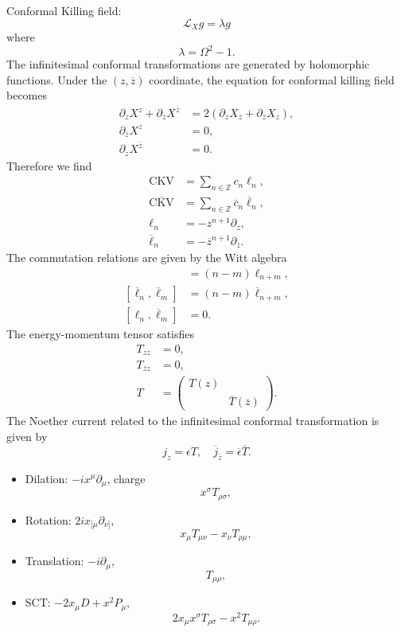 \documentclass{article}
\begin{document}
Conformal Killing field:
\[ \mathcal{L}_X g = \lambda g \]
where
\[ \lambda = \Omega^2 - 1. \]
The infinitesimal conformal transformations are generated by holomorphic functions.
Under the $(z,\overline{z})$ coordinate, the equation for conformal killing field becomes
\begin{align*}
    \partial_z X^z + \partial_{\overline{z}} X^{\overline{z}} &= 2(\partial_z X_{\overline{z}} + \partial_{\overline{z}} X_z), \\
    \partial_{\overline{z}} X^z &= 0, \\
    \partial_{z} X^{\overline{z}} &= 0.
\end{align*}
Therefore we find
\begin{align*}
    \mathrm{CKV} &= \sum_{n\in\mathbb{Z}} c_n \ell_n, \\
    \overline{\mathrm{CKV}} &= \sum_{n\in\mathbb{Z}} \overline{c}_n \overline{\ell}_n, \\
    \ell_n &= -z^{n+1} \partial_z, \\
    \overline{\ell}_n &= -\overline{z}^{n+1} \partial_{\overline{z}}.
\end{align*}
The commutation relations are given by the Witt algebra
\begin{align*}
    [\ell_n,\ell_m] &= (n-m) \ell_{n+m}, \\
    [\overline{\ell}_n, \overline{\ell}_m] &= (n-m) \overline{\ell}_{n+m}, \\
    [\ell_n,\overline{\ell}_m] &= 0.
\end{align*}
The energy-momentum tensor satisfies
\begin{align*}
    T_{z\overline{z}} &= 0, \\
    T_{\overline{z}z} &= 0, \\
    T &= \begin{pmatrix}
        T(z) & \\
        & \overline{T}(\overline{z})
    \end{pmatrix}.
\end{align*}
The Noether current related to the infinitesimal conformal transformation is given by
\[ j_z = \epsilon T,\quad \overline{j}_{\overline{z}} = \overline{\epsilon} \overline{T}. \]
\begin{itemize}
    \item Dilation: $-i x^\mu \partial_\mu$, charge
    \[ x^\sigma T_{\rho\sigma}, \]
    \item Rotation: $2i x_{[\mu}\partial_{\nu]}$,
    \[ x_{\mu} T_{\mu\nu} - x_{\nu} T_{\rho\mu}, \]
    \item Translation: $-i\partial_\mu$,
    \[ T_{\mu\rho}, \]
    \item SCT: $-2x_\mu D + x^2 P_\mu$,
    \[ 2x_\mu x^\sigma T_{\rho\sigma} - x^2 T_{\mu\rho}. \]
\end{itemize}
\end{document}
